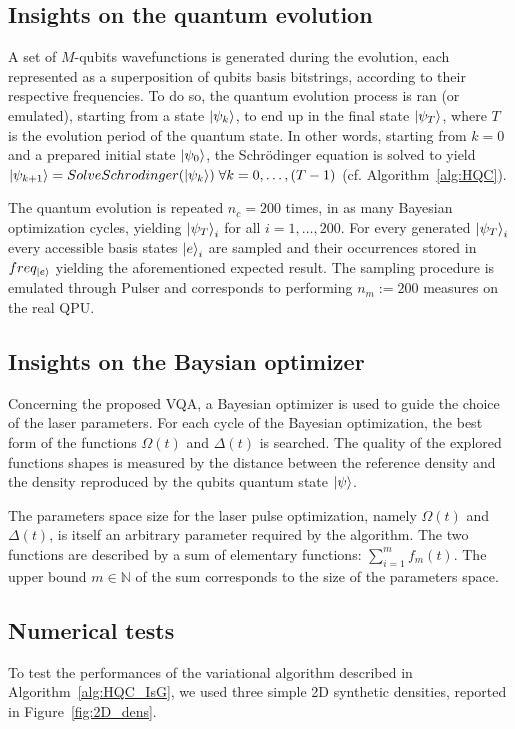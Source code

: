 \documentclass[fleqn,10pt]{wlscirep}
\begin{document}
\subsection{Insights on the quantum evolution}
A set of $M$-qubits wavefunctions is generated during the evolution, each represented as a superposition of qubits basis bitstrings, according to their respective frequencies. To do so, the quantum evolution process is ran (or emulated), starting from a state $\ket{\psi_k}$, to end up in the final state $\ket{\psi_{T}}$, where $T$ is the evolution period of the quantum state.
In other words, starting from $k=0$ and a prepared initial state $\ket{\psi_0}$, the Schrödinger equation is solved to yield $\ket{\psi_{k+1}}=SolveSchrodinger(\ket{ \psi_{k}})\;\forall k=0,\dots,(T-1)$ (cf. Algorithm~\ref{alg:HQC}).

 
The quantum evolution is repeated $n_c=200$ times, in as many Bayesian optimization cycles, yielding $\ket{\psi_T}_i$ for all $i=1,\dots,200$. For every generated $\ket{\psi_T}_i$ every accessible basis states $\ket{e}_i$ are sampled and their occurrences stored in $freq_{\ket{e}}$ yielding the aforementioned expected result. The sampling procedure is emulated through Pulser and  corresponds to performing $n_m:=200$ measures on the real QPU.

\subsection{Insights on the Baysian optimizer}
Concerning the proposed VQA, a Bayesian optimizer is used to guide the choice of the laser parameters. For each cycle of the Bayesian optimization, the best form of the functions $\Omega(t)$ and $\Delta(t)$ is searched. The quality of the explored functions shapes is measured by the distance between the reference density and the density reproduced by the qubits quantum state $\ket{\psi}$.

The parameters space size for the laser pulse optimization, namely $\Omega(t)$ and $\Delta(t)$, is itself an arbitrary parameter required by the algorithm. The two functions are described by a sum of elementary functions: $\sum_{i=1}^mf_m(t)$. The upper bound $m\in\mathbb{N}$ of the sum corresponds to the size of the parameters space.

\subsection{Numerical tests}

To test the performances of the variational algorithm described in Algorithm~\ref{alg:HQC_IsG}, we used three simple 2D synthetic densities, reported in Figure~\ref{fig:2D_dens}. 
\end{document}
